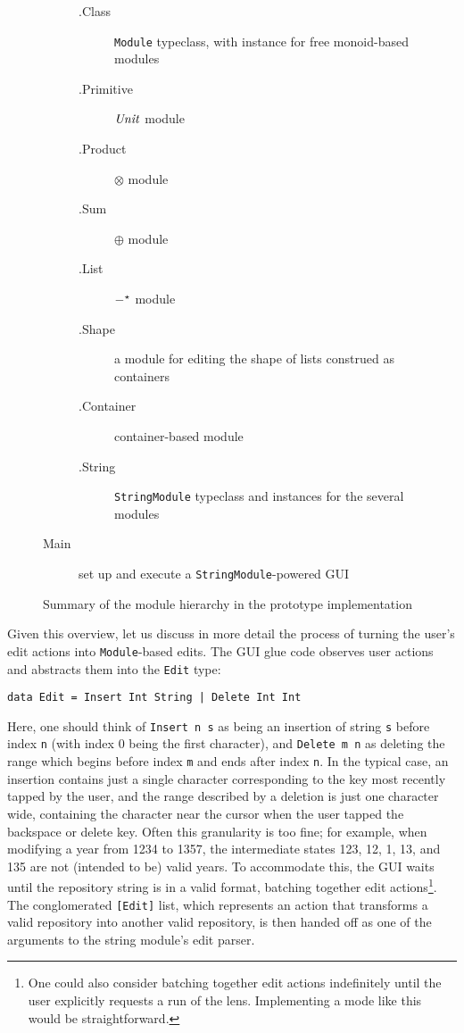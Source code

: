 \begin{figure}
\begin{description}
            \begin{description}
                \item[.Class] \texttt{Module} typeclass, with instance for
                    free monoid-based modules
                \item[.Primitive] $\mathit{Unit}$ module
                \item[.Product] $\otimes$ module
                \item[.Sum] $\oplus$ module
                \item[.List] $-^\star$ module
                \item[.Shape] a module for editing the shape of lists
                    construed as containers
                \item[.Container] container-based module
                \item[.String] \texttt{StringModule} typeclass and instances
                    for the several modules
            \end{description}
        \item[Main] set up and execute a \texttt{StringModule}-powered GUI
    \end{description}
    \caption{Summary of the module hierarchy in the prototype
    implementation}
    \label{fig:module-hierarchy}
\end{figure}

Given this overview, let us discuss in more detail the process of turning
the user's edit actions into \lstinline!Module!-based edits. The GUI glue code
observes user actions and abstracts them into the \lstinline!Edit! type:
\begin{lstlisting}
data Edit = Insert Int String | Delete Int Int
\end{lstlisting}
Here, one should think of \lstinline!Insert n s! as being an insertion of
string \lstinline!s! before index \lstinline!n! (with index 0 being the
first character), and \lstinline!Delete m n! as deleting the range which
begins before index \lstinline!m! and ends after index \lstinline!n!. In the
typical case, an insertion contains just a single character corresponding to
the key most recently tapped by the user, and the range described by a
deletion is just one character wide, containing the character near the
cursor when the user tapped the backspace or delete key. Often this
granularity is too fine; for example, when modifying a year from 1234 to
1357, the intermediate states 123, 12, 1, 13, and 135 are not (intended to
be) valid years. To accommodate this, the GUI waits until the repository
string is in a valid format, batching together edit actions\footnote{One
could also consider batching together edit actions indefinitely until the
user explicitly requests a run of the lens. Implementing a mode like this
would be straightforward.}. The conglomerated \lstinline![Edit]! list, which
represents an action that transforms a valid repository into another valid
repository, is then handed off as one of the arguments to the string
module's edit parser.

